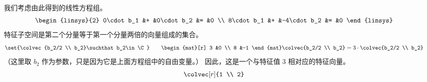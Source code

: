 \begin{exercises}
\begin{answer}
\begin{exparts}
           我们考虑由此得到的线性方程组。
           \begin{equation*}
             \begin{linsys}{2}
               0\cdot b_1  &+  &0\cdot b_2  &=  &0  \\
               8\cdot b_1  &+  &-4\cdot b_2 &=  &0
             \end{linsys}
           \end{equation*}
           特征子空间是第二个分量等于第一个分量两倍的向量组成的集合。
           \begin{equation*}
             \set{\colvec{b_2/2 \\ b_2}\suchthat b_2\in\C}
             \qquad
             \begin{mat}[r]
               3  &0  \\
               8  &-1
             \end{mat}
             \colvec{b_2/2  \\ b_2}
             =3\cdot\colvec{b_2/2 \\ b_2}
           \end{equation*}
           （这里取 $b_2$ 作为参数，只是因为它是上面方程组中的自由变量。）
           因此，这是一个与特征值 $3$ 相对应的特征向量。
           \begin{equation*}
             \colvec[r]{1 \\ 2}
           \end{equation*}


\end{exparts}
\end{answer}
\end{exercises}

